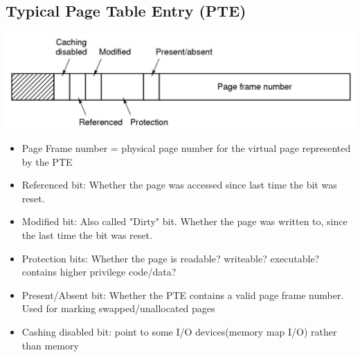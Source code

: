 \documentclass[12pt]{article}
\begin{document}
\subsection{Typical Page Table Entry (PTE)}
\includegraphics[width=\textwidth]{PTE.png}
\begin{itemize}
    \item Page Frame number = physical page number for the virtual page represented by the PTE
    \item Referenced bit: Whether the page was accessed since last time the bit was reset.
    \item Modified bit: Also called "Dirty" bit. Whether the page was written to, since the last time the bit was reset.
    \item Protection bits: Whether the page is readable? writeable? executable? contains higher privilege code/data?
    \item Present/Absent bit: Whether the PTE contains a valid page frame number. Used for marking swapped/unallocated pages
    \item Cashing disabled bit: point to some I/O devices(memory map I/O) rather than memory
\end{itemize}
\end{document}
